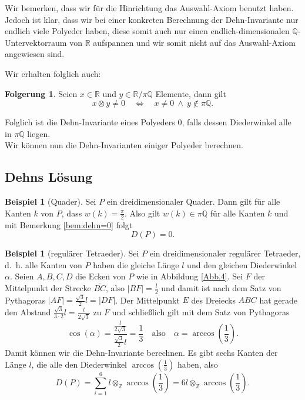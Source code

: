 \documentclass[11pt,titlepage]{article}
\newcommand{\setZ}{\mathbb{Z}}
\newcommand{\setQ}{\mathbb{Q}}
\newcommand{\setR}{\mathbb{R}}
\theoremstyle{definition}
\newtheorem{corollary}[theorem]{Folgerung}
\newtheorem{example}[theorem]{Beispiel}
\theoremstyle{remark}
\begin{document}
	Wir bemerken, dass wir für die Hinrichtung das Auswahl-Axiom 
	benutzt haben. Jedoch ist klar, dass wir bei einer konkreten Berechnung der 
	Dehn-Invariante nur endlich viele Polyeder haben, diese somit auch 
	nur einen endlich-dimensionalen $\setQ$-Untervektorraum von $\setR$ aufspannen und wir somit nicht auf das Auswahl-Axiom angewiesen sind.
	
	Wir erhalten folglich auch:
	
	\begin{corollary}
		Seien $x\in\setR$ und $y\in\setR/\pi\setQ$ Elemente, dann gilt
		\[ x\otimes y\neq0\quad\Leftrightarrow\quad x\neq 0 \ \land\ y\notin\pi\setQ. \]
	\end{corollary}
	
	Folglich ist die Dehn-Invariante eines Polyeders $0$, falls dessen Diederwinkel alle in $\pi\setQ$ liegen. \\
	
	Wir können nun die Dehn-Invarianten einiger Polyeder berechnen.
	
	\subsection{Dehns Lösung}
	
	\begin{example}[Quader] \label{exp:quader}
		Sei $P$ ein dreidimensionaler Quader. Dann gilt für alle Kanten $k$ von $P$, dass $w(k)=\frac{\pi}{2}$. 
		Also gilt $w(k)\in \pi\setQ$ für alle Kanten $k$ und mit Bemerkung \ref{bem:dehn=0} folgt
		\[ D(P)=0. \]
	\end{example}
	
	\begin{example}[regulärer Tetraeder] \label{exp:regTetr}
		Sei $P$ ein dreidimensionaler regulärer Tetraeder, d.~h. alle 
		Kanten von $P$ haben die gleiche Länge $l$ und 
		den gleichen Diederwinkel $\alpha$. Seien $A,B,C,D$ die Ecken von $P$ wie in Abbildung \ref{Abb.4}. 
		Sei $F$ der Mittelpunkt der Strecke $\overline{BC}$, also $|BF|=\frac{l}{2}$ und damit ist nach dem Satz von Pythagoras 
		$|AF|=\frac{\sqrt{3}}{2}l=|DF|$. Der Mittelpunkt $E$ des Dreiecks $ABC$ hat gerade den Abstand 
		$\frac{\sqrt{3}}{3 \cdot 2}l=\frac{l}{2\sqrt{3}}$ zu $F$ und schließlich gilt mit dem Satz von Pythagoras
		\[\cos(\alpha)=\frac{\frac{l}{2\sqrt{3}}}{\frac{\sqrt{3}}{2}l}=\frac{1}{3}\quad\text{also}
		\quad \alpha=\arccos\left(\frac{1}{3}\right). \]
		Damit können wir die Dehn-Invariante berechnen. Es gibt sechs Kanten der Länge $l$, die alle den 
		Diederwinkel $\arccos\left(\frac{1}{3}\right)$ haben, also
		\[ D(P)=\sum_{i=1}^6 l\otimes_{\setZ}\arccos\left(\frac{1}{3}\right)=6l\otimes_{\setZ}\arccos\left(\frac{1}{3}\right).\]
	\end{example}
	
\end{document}
